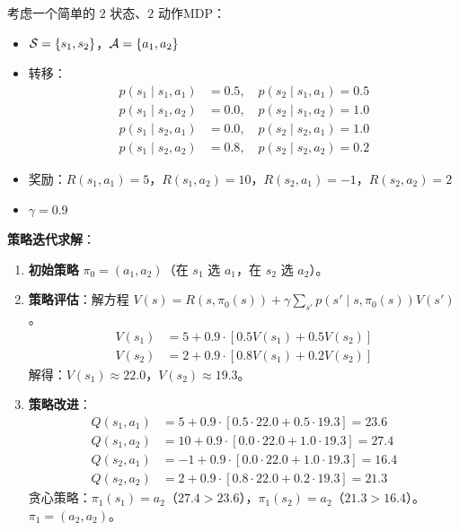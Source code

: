 \begin{example}
考虑一个简单的 $2$ 状态、$2$ 动作MDP：
\begin{itemize}
    \item $\mathcal{S} = \{s_1, s_2\}$，$\mathcal{A} = \{a_1, a_2\}$
    \item 转移：
    \begin{align*}
    p(s_1 \mid s_1, a_1) &= 0.5, \quad p(s_2 \mid s_1, a_1) = 0.5 \\
    p(s_1 \mid s_1, a_2) &= 0.0, \quad p(s_2 \mid s_1, a_2) = 1.0 \\
    p(s_1 \mid s_2, a_1) &= 0.0, \quad p(s_2 \mid s_2, a_1) = 1.0 \\
    p(s_1 \mid s_2, a_2) &= 0.8, \quad p(s_2 \mid s_2, a_2) = 0.2
    \end{align*}
    \item 奖励：$R(s_1, a_1) = 5$，$R(s_1, a_2) = 10$，$R(s_2, a_1) = -1$，$R(s_2, a_2) = 2$
    \item $\gamma = 0.9$
\end{itemize}

\textbf{策略迭代求解}：
\begin{enumerate}
    \item \textbf{初始策略} $\pi_0 = (a_1, a_2)$（在 $s_1$ 选 $a_1$，在 $s_2$ 选 $a_2$）。
    
    \item \textbf{策略评估}：解方程 $V(s) = R(s, \pi_0(s)) + \gamma \sum_{s'} p(s' \mid s, \pi_0(s)) V(s')$。
    \begin{align*}
    V(s_1) &= 5 + 0.9 \cdot [0.5 V(s_1) + 0.5 V(s_2)] \\
    V(s_2) &= 2 + 0.9 \cdot [0.8 V(s_1) + 0.2 V(s_2)]
    \end{align*}
    解得：$V(s_1) \approx 22.0$，$V(s_2) \approx 19.3$。
    
    \item \textbf{策略改进}：
    \begin{align*}
    Q(s_1, a_1) &= 5 + 0.9 \cdot [0.5 \cdot 22.0 + 0.5 \cdot 19.3] = 23.6 \\
    Q(s_1, a_2) &= 10 + 0.9 \cdot [0.0 \cdot 22.0 + 1.0 \cdot 19.3] = 27.4 \\
    Q(s_2, a_1) &= -1 + 0.9 \cdot [0.0 \cdot 22.0 + 1.0 \cdot 19.3] = 16.4 \\
    Q(s_2, a_2) &= 2 + 0.9 \cdot [0.8 \cdot 22.0 + 0.2 \cdot 19.3] = 21.3
    \end{align*}
    贪心策略：$\pi_1(s_1) = a_2$（$27.4 > 23.6$），$\pi_1(s_2) = a_2$（$21.3 > 16.4$）。$\pi_1 = (a_2, a_2)$。
    

\end{enumerate}
\end{example}
